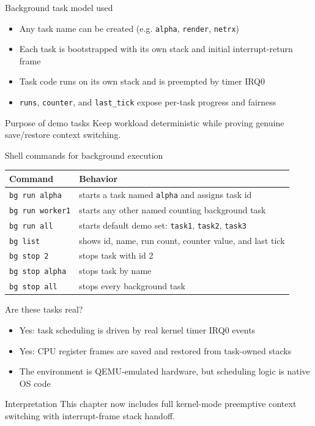 \documentclass[aspectratio=169]{beamer}
\newcommand{\concept}[2]{%
  \begin{block}{#1}\smallskip #2\smallskip\end{block}\vspace{5pt}}
\begin{document}
\begin{frame}{Background task model used}
  \begin{itemize}
    \item Any task name can be created (e.g. \texttt{alpha}, \texttt{render}, \texttt{netrx})
    \item Each task is bootstrapped with its own stack and initial interrupt-return frame
    \item Task code runs on its own stack and is preempted by timer IRQ0
    \item \texttt{runs}, \texttt{counter}, and \texttt{last\_tick} expose per-task progress and fairness
  \end{itemize}
  \concept{Purpose of demo tasks}{
    Keep workload deterministic while proving genuine save/restore context switching.
  }
\end{frame}

\begin{frame}{Shell commands for background execution}
  \small
  \begin{tabular}{@{}p{3.2cm}p{8.8cm}@{}}
    \toprule
    \textbf{Command} & \textbf{Behavior} \\
    \midrule
    \texttt{bg run alpha} & starts a task named \texttt{alpha} and assigns task id \\
    \texttt{bg run worker1} & starts any other named counting background task \\
    \texttt{bg run all} & starts default demo set: \texttt{task1}, \texttt{task2}, \texttt{task3} \\
    \texttt{bg list} & shows id, name, run count, counter value, and last tick \\
    \texttt{bg stop 2} & stops task with id 2 \\
    \texttt{bg stop alpha} & stops task by name \\
    \texttt{bg stop all} & stops every background task \\
    \bottomrule
  \end{tabular}
\end{frame}

\begin{frame}{Are these tasks real?}
  \begin{itemize}
    \item Yes: task scheduling is driven by real kernel timer IRQ0 events
    \item Yes: CPU register frames are saved and restored from task-owned stacks
    \item The environment is QEMU-emulated hardware, but scheduling logic is native OS code
  \end{itemize}
  \concept{Interpretation}{
    This chapter now includes full kernel-mode preemptive context switching
    with interrupt-frame stack handoff.
  }
\end{frame}
\end{document}
